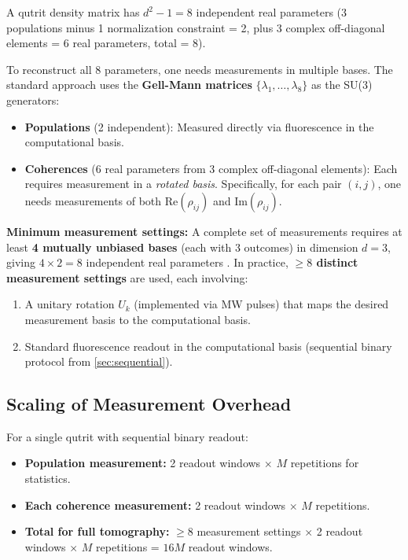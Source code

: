 \documentclass[11pt,letterpaper]{article}
\begin{document}
A qutrit density matrix has $d^2 - 1 = 8$ independent real parameters
(3 populations minus 1 normalization constraint = 2, plus 3 complex
off-diagonal elements = 6 real parameters, total = 8).

To reconstruct all 8 parameters, one needs measurements in multiple bases.
The standard approach uses the \textbf{Gell-Mann matrices} $\{\lambda_1,
\ldots, \lambda_8\}$ as the SU(3) generators:

\begin{itemize}
  \item \textbf{Populations} (2 independent): Measured directly via
    fluorescence in the computational basis.
  \item \textbf{Coherences} (6 real parameters from 3 complex off-diagonal
    elements): Each requires measurement in a \emph{rotated basis}.
    Specifically, for each pair $(i,j)$, one needs measurements of both
    $\text{Re}(\rho_{ij})$ and $\text{Im}(\rho_{ij})$.
\end{itemize}

\textbf{Minimum measurement settings:} A complete set of measurements
requires at least \textbf{4 mutually unbiased bases} (each with 3 outcomes)
in dimension $d=3$, giving $4 \times 2 = 8$ independent real parameters
\cite{Wootters1989}.  In practice, \textbf{$\geq 8$ distinct measurement
settings} are used, each involving:
\begin{enumerate}
  \item A unitary rotation $U_k$ (implemented via MW pulses) that maps the
    desired measurement basis to the computational basis.
  \item Standard fluorescence readout in the computational basis (sequential
    binary protocol from \cref{sec:sequential}).
\end{enumerate}

\subsection{Scaling of Measurement Overhead}

For a single qutrit with sequential binary readout:
\begin{itemize}
  \item \textbf{Population measurement:} 2 readout windows $\times$ $M$
    repetitions for statistics.
  \item \textbf{Each coherence measurement:} 2 readout windows $\times$ $M$
    repetitions.
  \item \textbf{Total for full tomography:} $\geq 8$ measurement settings
    $\times$ 2 readout windows $\times$ $M$ repetitions = $16M$ readout
    windows.
\end{itemize}
\end{document}
